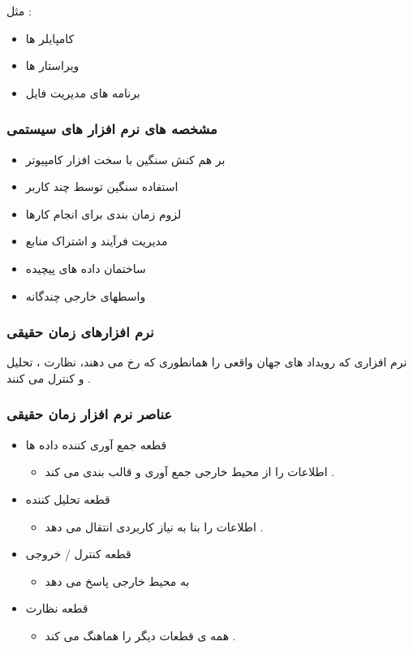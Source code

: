 \documentclass[12pt]{book}
\begin{document}
 مثل : 
\begin{itemize}
	\item کامپایلر ها
	\item ویراستار ها
	\item برنامه های مدیریت فایل
\end{itemize}


\subsubsection{مشخصه های نرم افزار های سیستمی}

\begin{itemize}
	\item بر هم کنش سنگین با سخت افزار کامپیوتر
	\item استفاده سنگین توسط چند کاربر
	\item لزوم زمان بندی برای انجام کارها
	\item مدیریت فرآیند و اشتراک منابع
	\item ساختمان داده های پیچیده
	\item واسطهای خارجی چندگانه
\end{itemize}



\subsubsection{نرم افزارهای زمان حقیقی}

نرم افزاری که رویداد های جهان واقعی را همانطوری که رخ می دهند، نظارت ، تحلیل و کنترل می کنند .

\subsubsection{عناصر نرم افزار زمان حقیقی}

\begin{itemize}
	\item قطعه جمع آوری کننده داده ها
	\begin{itemize}
		\item اطلاعات را از محیط خارجی جمع آوری و قالب بندی می کند .
	\end{itemize}
	\item قطعه تحلیل کننده
	\begin{itemize}
		\item اطلاعات را بنا به نیاز کاربردی انتقال می دهد .
	\end{itemize}
	\item قطعه کنترل / خروجی
	\begin{itemize}
		\item به محیط خارجی پاسخ می دهد
	\end{itemize}
	\item قطعه نظارت
	\begin{itemize}
		\item همه ی قطعات دیگر را هماهنگ می کند .
	\end{itemize}
\end{itemize}
\end{document}

